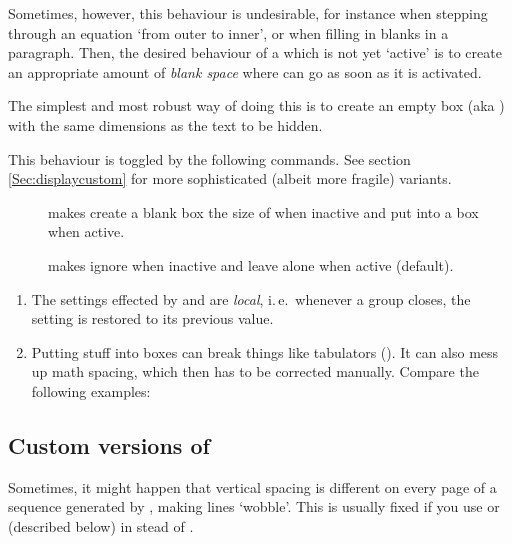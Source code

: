 \begin{slide}
  Sometimes, however, this behaviour is undesirable, for instance when stepping through an equation `from outer to
  inner', or when filling in blanks in a paragraph. Then, the desired behaviour of a  which is not yet
  `active' is to create an appropriate amount of \emph{blank space} where  can go as soon as it is
  activated.

  \newslide

  The simplest and most robust way of doing this is to create an empty box (aka ) with the same
  dimensions as the text to be hidden.

  This behaviour is toggled by the following commands. See section \ref{Sec:displaycustom} for more sophisticated
  (albeit more fragile) variants.
  \begin{description}
  \item[] makes  create a blank box the size of  when
    inactive and put  into a box when active.
  \item[] makes  ignore  when inactive and leave
     alone when active (default).
  \end{description}

  \newslide

  \begin{enumerate}
  \item The settings effected by  and  are \emph{local}, i.\,e.\ whenever
    a group closes, the setting is restored to its previous value.

  \item Putting stuff into boxes can break things like tabulators (\code{\&}). It can also mess up math spacing, which
    then has to be corrected manually. Compare the following examples:

  \end{enumerate}

  \newslide

  \subsection{Custom versions of }%
  Sometimes, it might happen that vertical spacing is different on every page of a sequence generated by
  , making lines `wobble'. This is usually fixed if you use  or
   (described below) in stead of .


\end{slide}
